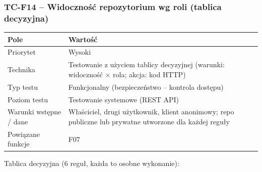 \subsubsection{TC-F14 – Widoczność repozytorium wg roli (tablica decyzyjna)}
{\small
\par\smallskip\noindent\begin{tabular}{>{\raggedright\arraybackslash}p{}>{\raggedright\arraybackslash}p{}}
\toprule
\textbf{Pole} & \textbf{Wartość} \\
\midrule
Priorytet & Wysoki \\
Technika & Testowanie z użyciem tablicy decyzyjnej (warunki: widoczność $\times$ rola; akcja: kod HTTP) \\
Typ testu & Funkcjonalny (bezpieczeństwo – kontrola dostępu) \\
Poziom testu & Testowanie systemowe (REST API) \\
Warunki wstępne / dane & Właściciel, drugi użytkownik, klient anonimowy; repo publiczne lub prywatne utworzone dla każdej reguły \\
Powiązane funkcje & F07 \\
\bottomrule
\end{tabular}\par\smallskip
}
Tablica decyzyjna (6 reguł, każda to osobne wykonanie):

